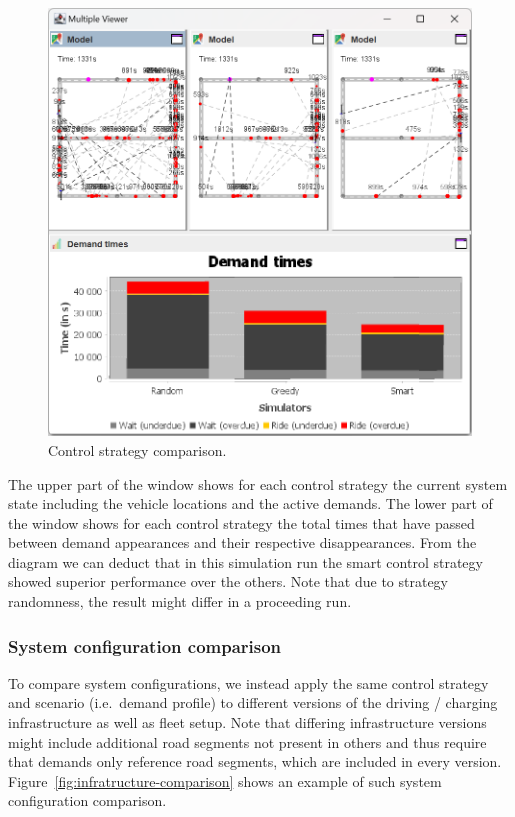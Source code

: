 \documentclass[a4paper,twoside]{article}
\begin{document}
	\begin{figure}[!ht]
		\centering
		\includegraphics[width=0.85\columnwidth]{./graphics/screenshots/controller_comparison.png}
		\caption{Control strategy comparison.}
		\label{fig:controller-comparison}
	\end{figure}

	The upper part of the window shows for each control strategy the current system state including the vehicle locations and the active demands.
	The lower part of the window shows for each control strategy the total times that have passed between demand appearances and their respective disappearances.
	From the diagram we can deduct that in this simulation run the smart control strategy showed superior performance over the others.
	Note that due to strategy randomness, the result might differ in a proceeding run.
	
	\subsubsection{System configuration comparison}
	\label{sec:infrastructure-comparison}
	
	To compare system configurations, we instead apply the same control strategy and scenario (i.e.\ demand profile) to different versions of the driving / charging infrastructure as well as fleet setup.
	Note that differing infrastructure versions might include additional road segments not present in others and thus require that demands only reference road segments, which are included in every version.
	Figure~\ref{fig:infratructure-comparison} shows an example of such system configuration comparison.
\end{document}
